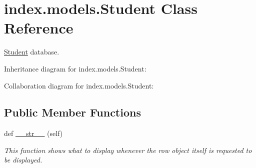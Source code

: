 \hypertarget{classindex_1_1models_1_1Student}{}\section{index.\+models.\+Student Class Reference}
\label{classindex_1_1models_1_1Student}


\hyperlink{classindex_1_1models_1_1Student}{Student} database.  




Inheritance diagram for index.\+models.\+Student\+:


Collaboration diagram for index.\+models.\+Student\+:
\subsection*{Public Member Functions}
\begin{DoxyCompactItemize}
\item 
def \hyperlink{classindex_1_1models_1_1Student_abf610ed89f9af9fc46ab4bd4b7f96b27}{\+\_\+\+\_\+str\+\_\+\+\_\+} (self)
\begin{DoxyCompactList}\small\item\em This function shows what to display whenever the row object itself is requested to be displayed. \end{DoxyCompactList}\end{DoxyCompactItemize}
